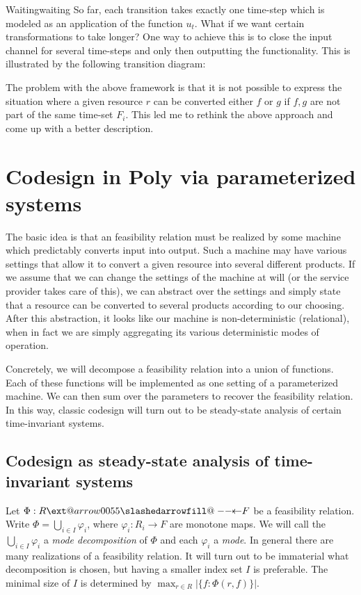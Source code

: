 \documentclass[12pt, a4paper]{article}
\makeatletter
\theoremstyle{definition}
\theoremstyle{plain}
\theoremstyle{plain}
\theoremstyle{plain}
\theoremstyle{plain}
\theoremstyle{plain}
\theoremstyle{remark}
\theoremstyle{remark}
\def\slashedarrowfill@#1#2#3#4#5{%
	$\m@th\thickmuskip0mu\medmuskip\thickmuskip\thinmuskip\thickmuskip
	\relax#5#1\mkern-7mu%
	\cleaders\hbox{$#5\mkern-2mu#2\mkern-2mu$}\hfill
	\mathclap{#3}\mathclap{#2}%
	\cleaders\hbox{$#5\mkern-2mu#2\mkern-2mu$}\hfill
	\mkern-7mu#4$%
}
\def\leftslashedarrowfill@{%
	\slashedarrowfill@\relbar\relbar\mapstochar\leftarrow}
\newcommand\xslashedleftarrow[2][]{%
	\ext@arrow 0055{\leftslashedarrowfill@}{#1}{#2}}
\newcommand{\bprof}{\xslashedleftarrow{}}
\makeatother
\begin{document}
\begin{tcexample}{Waiting}{waiting}
    So far, each transition takes exactly one time-step which is modeled as an application of the function $u_t$. What if we want certain transformations to take longer? One way to achieve this is to close the input channel for several time-steps and only then outputting the functionality. This is illustrated by the following transition diagram:

\end{tcexample}

The problem with the above framework is that it is not possible to express the situation where a given resource $r$ can be converted either $f$ or $g$ if $f,g$ are not part of the same time-set $F_i$. This led me to rethink the above approach and come up with a better description.

\section{Codesign in \textsf{Poly} via parameterized systems}\label{sec:parameterized-systems}
The basic idea is that an feasibility relation must be realized by some machine which predictably converts input into output. Such a machine may have various settings that allow it to convert a given resource into several different products. If we assume that we can change the settings of the machine at will (or the service provider takes care of this), we can abstract over the settings and simply state that a resource can be converted to several products according to our choosing. After this abstraction, it looks like our machine is non-deterministic (relational), when in fact we are simply aggregating its various deterministic modes of operation.

Concretely, we will decompose a feasibility relation into a union of functions. Each of these functions will be implemented as one setting of a parameterized machine. We can then sum over the parameters to recover the feasibility relation. In this way, classic codesign will turn out to be steady-state analysis of certain time-invariant systems.

\subsection{Codesign as steady-state analysis of time-invariant systems}
Let $\Phi: R \bprof F$ be a feasibility relation. Write $\Phi = \bigcup_{i \in I} \varphi_i$, where $\varphi_i: R_i \rightarrow F$ are monotone maps. We will call the $\bigcup_{i \in I} \varphi_i$ a \emph{mode decomposition} of $\Phi$ and each $\varphi_i$ a \emph{mode}. In general there are many realizations of a feasibility relation. It will turn out to be immaterial what decomposition is chosen, but having a smaller index set $I$ is preferable. The minimal size of $I$ is determined by $\max_{r \in R}{| \{f : \Phi(r,f) \} |}$.
\end{document}
